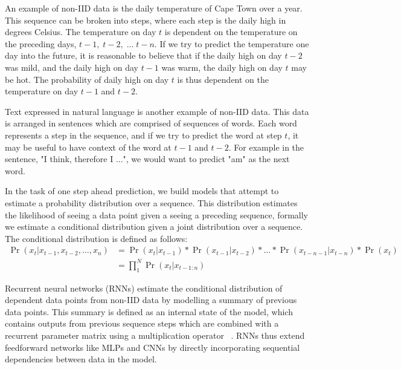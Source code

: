 \noindent An example of non-IID data is the daily temperature of Cape Town over a year. This sequence can be broken into steps, where each step is the daily high in degrees Celsius. The temperature on day $ t $ is dependent on the temperature on the preceding days, $ t - 1, \; t - 2, \; \dots \; t - n $. If we try to predict the temperature one day into the future, it is reasonable to believe that if the daily high on day $ t - 2 $ was mild, and the daily high on day $ t - 1 $ was warm, the daily high on day $ t $ may be hot. The probability of daily high on day $ t $ is thus dependent on the temperature on day $ t - 1$ and $ t - 2$. \par
 
\noindent Text expressed in natural language is another example of non-IID data. This data is arranged in sentences which are comprised of sequences of words. Each word represents a step in the sequence, and if we try to predict the word at step $ t $, it may be useful to have context of the word at $t -1$ and $t - 2$. For example in the sentence, "I think, therefore I ...", we would want to predict "am" as the next word. \par

\noindent In the task of one step ahead prediction, we build models that attempt to estimate a probability distribution over a sequence. This distribution estimates the likelihood of seeing a data point given a seeing a preceding sequence, formally we estimate a conditional distribution given a joint distribution over a sequence. The conditional distribution is defined as follows:
\begin{equation}
	\begin{split}
		\Pr( x_t | x_{t - 1},  x_{t - 2}, \dots,  x_n ) & = \Pr(x_t | x_{t - 1}) * \Pr(x_{t - 1}| x_{t - 2}) * \dots * \Pr(x_{t - n - 1}| x_{t - n}) * \Pr(x_t) \\
		& =\prod_{1}^N \Pr(x_t | x_{t - 1:n})
	\end{split}
\end{equation}

\noindent Recurrent neural networks (RNNs) estimate the conditional distribution of dependent data points from non-IID data by modelling a summary of previous data points. This summary is defined as an internal state of the model, which contains outputs from previous sequence steps which are combined with a recurrent parameter matrix using a multiplication operator \unskip ~\citep{werbos1988generalization}. RNNs thus extend feedforward networks like MLPs and CNNs by directly incorporating sequential dependencies between data in the model. \par

